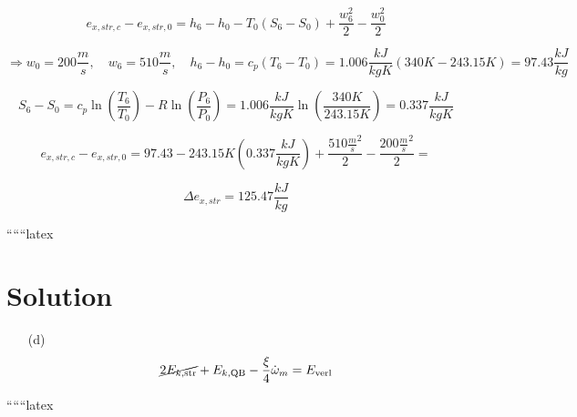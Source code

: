 \[
e_{x,str,c} - e_{x,str,0} = h_6 - h_0 - T_0 (S_6 - S_0) + \frac{w_6^2}{2} - \frac{w_0^2}{2}
\]

\[
\Rightarrow w_0 = 200 \frac{m}{s}, \quad w_6 = 510 \frac{m}{s}, \quad h_6 - h_0 = c_p (T_6 - T_0) = 1.006 \frac{kJ}{kgK} (340 K - 243.15 K) = 97.43 \frac{kJ}{kg}
\]

\[
S_6 - S_0 = c_p \ln \left( \frac{T_6}{T_0} \right) - R \ln \left( \frac{P_6}{P_0} \right) = 1.006 \frac{kJ}{kgK} \ln \left( \frac{340 K}{243.15 K} \right) = 0.337 \frac{kJ}{kgK}
\]

\[
e_{x,str,c} - e_{x,str,0} = 97.43 - 243.15 K (0.337 \frac{kJ}{kgK}) + \frac{510 \frac{m}{s}^2}{2} - \frac{200 \frac{m}{s}^2}{2} =
\]

\[
\Delta e_{x,str} = 125.47 \frac{kJ}{kg}
\]

``````latex


\section*{Solution}

\begin{itemize}
    \item[(d)] 
    \[
    \cancel{2E_{k, \text{str}}} + E_{k, \text{QB}} - \frac{\xi}{4} \dot{\omega}_m = E_{\text{verl}}
    \]
\end{itemize}

``````latex



